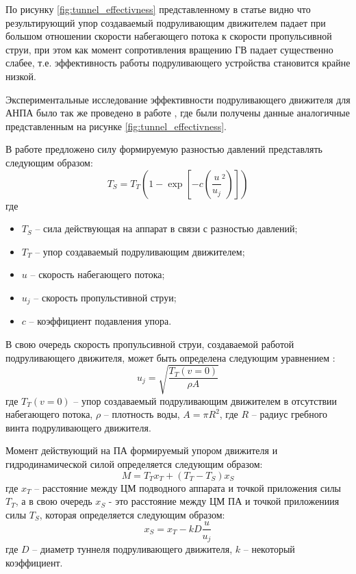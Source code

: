 По рисунку \ref{fig:tunnel_effectivness} представленному в статье \cite{chislett1966influence} видно что результирующий упор создаваемый подруливающим движителем падает при большом отношении скорости набегающего потока к скорости пропульсивной струи, при этом как момент сопротивления вращению ГВ падает существенно слабее, т.е. эффективность работы подруливающего устройства становится крайне низкой.

Экспериментальные исследование эффективности подруливающего движителя для АНПА было так же проведено в работе \cite{beveridge1972design}, где были получены данные аналогичные представленным на рисунке \ref{fig:tunnel_effectivness}.

В работе \cite{palmer2009analysis} предложено силу формируемую разностью давлений представлять следующим образом:
\begin{equation}
    \label{eq:thrust_tunnel}
	T_S = T_T (1 - \exp \left[ -c \left( \frac{u}{u_j}^2 \right) \right])
\end{equation}
\noindent где
\begin{itemize}
	\item $T_S$ -- сила действующая на аппарат в связи с разностью давлений;
	\item $T_T$ -- упор создаваемый подруливающим движителем;
	\item $u$ -- скорость набегающего потока;
	\item $u_j$ -- скорость пропульстивной струи;
	\item $c$ -- коэффициент подавления упора.
\end{itemize}

В свою очередь скорость пропульсивной струи, создаваемой работой подруливающего движителя, может быть определена следующим уравнением \cite{palmer2009analysis}:
\begin{equation}
    \label{eq:jetflow_speed}
	u_j = \sqrt{\frac{T_T(v=0)}{\rho A}}
\end{equation}
\noindent где $T_T(v=0)$ -- упор создаваемый подруливающим движителем в отсутствии набегающего потока, $\rho$ -- плотность воды, $A=\pi R^2$, где $R$ -- радиус гребного винта подруливающего движителя.

Момент действующий на ПА формируемый упором движителя и гидродинамической силой определяется следующим образом:
\begin{equation*}
	M = T_T x_T + (T_T-T_S)x_S
\end{equation*}
\noindent где $x_T$ -- расстояние между ЦМ подводного аппарата и точкой приложения силы $T_T$, а в свою очередь $x_S$ - это расстояние между ЦМ ПА и точкой приложениия силы $T_S$, которая определяется следующим образом:
\begin{equation*}
	x_S = x_T - kD\frac{u}{u_j}
\end{equation*}
\noindent где $D$ -- диаметр туннеля подруливающего движителя, $k$ -- некоторый коэффициент.


